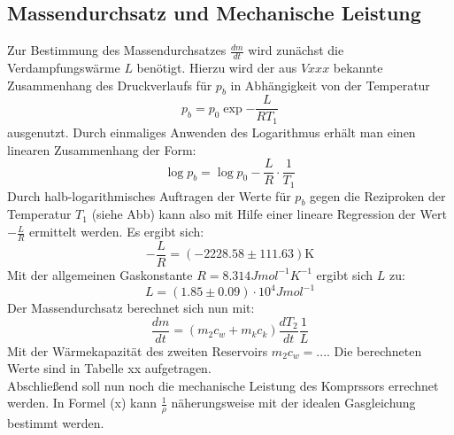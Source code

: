 \subsection{Massendurchsatz und Mechanische Leistung}
Zur Bestimmung des Massendurchsatzes $\frac{dm}{dt}$ wird zunächst die Verdampfungswärme $L$ benötigt. Hierzu wird der aus $Vxxx$ bekannte Zusammenhang des Druckverlaufs für $p_b$ in Abhängigkeit von der Temperatur
\begin{equation}
  p_b = p_0 \exp{-\frac{L}{R T_1}}
\end{equation}
ausgenutzt. Durch einmaliges Anwenden des Logarithmus erhält man einen linearen Zusammenhang der Form:
\begin{equation}
  \log{p_b} = \log{p_0} -\frac{L}{R} \cdot \frac{1}{T_1}
\end{equation}
Durch halb-logarithmisches Auftragen der Werte für $p_b$ gegen die Reziproken der Temperatur $T_1$ (siehe Abb) kann also mit Hilfe einer lineare Regression der Wert $-\frac{L}{R}$ ermittelt werden.
Es ergibt sich:
\begin{equation}
  -\frac{L}{R} =  (-2228.58 \pm 111.63) \si{\kelvin}
\end{equation}
Mit der allgemeinen Gaskonstante $R = 8.314 J mol^{-1} K ^{-1}$ ergibt sich $L$ zu:
\begin{equation}
  L = (1.85 \pm 0.09)\cdot 10^{4} J mol^{-1}
\end{equation}
Der Massendurchsatz berechnet sich nun mit:
\begin{equation}
  \frac{dm}{dt} = (m_2 c_w + m_k c_k)\frac{dT_2}{dt} \frac{1}{L}
\end{equation}
Mit der Wärmekapazität des zweiten Reservoirs $m_2 c_w = ...$. Die berechneten Werte sind in Tabelle xx aufgetragen. \\
Abschließend soll nun noch die mechanische Leistung des Komprssors errechnet werden. In Formel (x) kann $\frac{1}{\rho}$
näherungsweise mit der idealen Gasgleichung bestimmt werden. 






